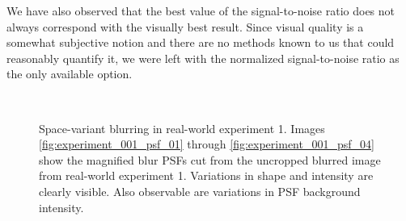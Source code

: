 \documentclass[12pt,notitlepage]{report}
\begin{document}
We have also observed that the best value of the signal-to-noise ratio does not always correspond with the visually best result. Since visual quality is a somewhat subjective notion and there are no methods known to us that could reasonably quantify it, we were left with the normalized signal-to-noise ratio as the only available option.   

\begin{figure}[h]
  \centering
	  ~
	  ~
	  ~
  \caption[Space-variant blurring in real-world experiment 1]{Space-variant blurring in real-world experiment 1. Images \ref{fig:experiment_001_psf_01} through \ref{fig:experiment_001_psf_04} show the magnified blur PSFs cut from the uncropped blurred image from real-world experiment 1. Variations in shape and intensity are clearly visible. Also observable are variations in PSF background intensity.}
  \label{fig:experiment_001_psf_variations}
\end{figure}
\end{document}
